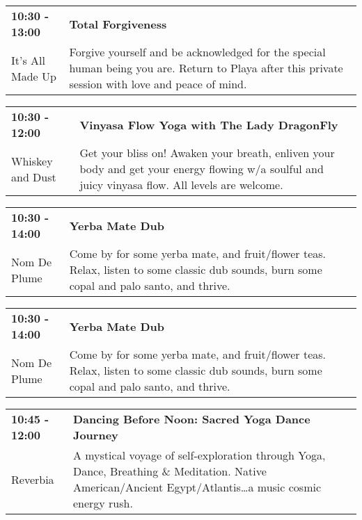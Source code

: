 \begin{tabular}{ p{1in} p{2.2in} }
    \textbf{10:30 - 13:00} & \textbf{Total Forgiveness} \\
    It's All Made Up \newline  & Forgive yourself and be acknowledged for the special human being you are. Return to Playa after this private session  with love and peace of mind. \\
    \hline 
\end{tabular}
    
\begin{tabular}{ p{1in} p{2.2in} }
    \textbf{10:30 - 12:00} & \textbf{Vinyasa Flow Yoga with The Lady DragonFly} \\
    Whiskey and Dust \newline  & Get your bliss on! Awaken your breath, enliven your body and get your energy flowing w/a soulful and juicy vinyasa flow. All levels are welcome. \\
    \hline 
\end{tabular}
    
\begin{tabular}{ p{1in} p{2.2in} }
    \textbf{10:30 - 14:00} & \textbf{Yerba Mate Dub} \\
    Nom De Plume \newline  & Come by for some yerba mate, and fruit/flower teas. Relax, listen to some classic dub sounds, burn some copal and palo santo, and thrive. \\
    \hline 
\end{tabular}
    
\begin{tabular}{ p{1in} p{2.2in} }
    \textbf{10:30 - 14:00} & \textbf{Yerba Mate Dub} \\
    Nom De Plume \newline  & Come by for some yerba mate, and fruit/flower teas. Relax, listen to some classic dub sounds, burn some copal and palo santo, and thrive. \\
    \hline 
\end{tabular}
    
\begin{tabular}{ p{1in} p{2.2in} }
    \textbf{10:45 - 12:00} & \textbf{Dancing Before Noon:  Sacred Yoga Dance Journey} \\
    Reverbia \newline  & A mystical voyage of self-exploration through Yoga, Dance, Breathing \& Meditation.  Native American/Ancient Egypt/Atlantis\ldots a music cosmic energy rush. \\
    \hline 
\end{tabular}
    
